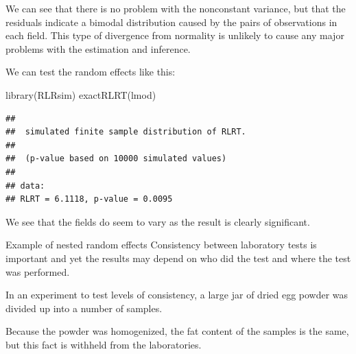 \documentclass[
  ignorenonframetext,
]{beamer}
\newenvironment{Shaded}{\begin{snugshade}}{\end{snugshade}}
\newcommand{\FunctionTok}[1]{\textcolor[rgb]{0.00,0.00,0.00}{#1}}
\newcommand{\NormalTok}[1]{#1}
\begin{document}
\begin{frame}[fragile]{}
\protect\hypertarget{section-10}{}
We can see that there is no problem with the nonconstant variance, but
that the residuals indicate a bimodal distribution caused by the pairs
of observations in each field. This type of divergence from normality is
unlikely to cause any major problems with the estimation and inference.

We can test the random effects like this:

\vspace{12pt}
\tiny

\begin{Shaded}
\begin{Highlighting}[]
\FunctionTok{library}\NormalTok{(RLRsim)}
\FunctionTok{exactRLRT}\NormalTok{(lmod)}
\end{Highlighting}
\end{Shaded}

\begin{verbatim}
## 
##  simulated finite sample distribution of RLRT.
##  
##  (p-value based on 10000 simulated values)
## 
## data:  
## RLRT = 6.1118, p-value = 0.0095
\end{verbatim}

\vspace{12pt}
\normalsize

We see that the fields do seem to vary as the result is clearly
significant.
\end{frame}

\begin{frame}{Example of nested random effects}
\protect\hypertarget{example-of-nested-random-effects}{}
Consistency between laboratory tests is important and yet the results
may depend on who did the test and where the test was performed.

In an experiment to test levels of consistency, a large jar of dried egg
powder was divided up into a number of samples.

Because the powder was homogenized, the fat content of the samples is
the same, but this fact is withheld from the laboratories.
\end{frame}
\end{document}
